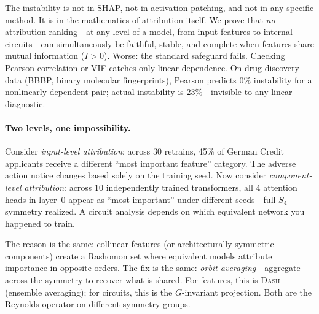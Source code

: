 \documentclass{article}
\newcommand{\DASH}{\textsc{Dash}}
\begin{document}
The instability is not in SHAP, not in activation patching, and not in any specific method. It is in the mathematics of attribution itself. We prove that \emph{no} attribution ranking---at any level of a model, from input features to internal circuits---can simultaneously be faithful, stable, and complete when features share mutual information ($I > 0$). Worse: the standard safeguard fails. Checking Pearson correlation or VIF catches only linear dependence. On drug discovery data (BBBP, binary molecular fingerprints), Pearson predicts 0\% instability for a nonlinearly dependent pair; actual instability is 23\%---invisible to any linear diagnostic.

\paragraph{Two levels, one impossibility.}
Consider \emph{input-level attribution}: across 30 retrains, 45\% of German Credit applicants receive a different ``most important feature'' category. The adverse action notice changes based solely on the training seed.
Now consider \emph{component-level attribution}: across 10 independently trained transformers, all 4 attention heads in layer~0 appear as ``most important'' under different seeds---full $S_4$ symmetry realized. A circuit analysis depends on which equivalent network you happened to train.

The reason is the same: collinear features (or architecturally symmetric components) create a Rashomon set where equivalent models attribute importance in opposite orders. The fix is the same: \emph{orbit averaging}---aggregate across the symmetry to recover what is shared. For features, this is \DASH{} (ensemble averaging); for circuits, this is the $G$-invariant projection. Both are the Reynolds operator on different symmetry groups.
\end{document}
